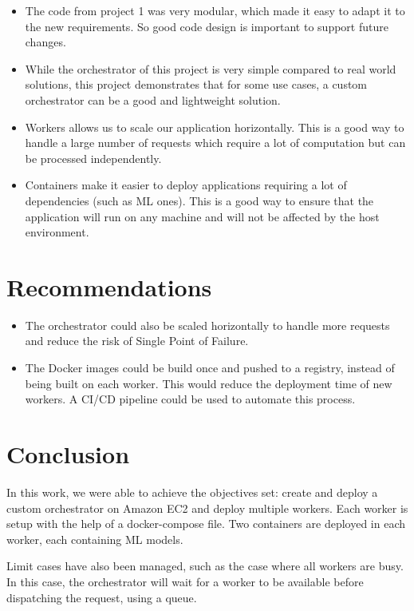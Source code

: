 \documentclass[letterpaper,headings=standardclasses,parskip=half]{scrartcl}
\begin{document}
\begin{itemize}
    \item The code from project 1 was very modular, which made it easy to adapt it to the new requirements. So good code design is important to support future changes.
    \item While the orchestrator of this project is very simple compared to real world solutions, this project demonstrates that for some use cases, a custom orchestrator can be a good and lightweight solution.
    \item Workers allows us to scale our application horizontally. This is a good way to handle a large number of requests which require a lot of computation but can be processed independently.
    \item Containers make it easier to deploy applications requiring a lot of dependencies (such as ML ones). This is a good way to ensure that the application will run on any machine and will not be affected by the host environment.
\end{itemize}

\section{Recommendations}

\begin{itemize}
    \item The orchestrator could also be scaled horizontally to handle more requests and reduce the risk of Single Point of Failure.
    \item The Docker images could be build once and pushed to a registry, instead of being built on each worker. This would reduce the deployment time of new workers. A CI/CD pipeline could be used to automate this process.
\end{itemize}

\section{Conclusion}

In this work, we were able to achieve the objectives set: create and deploy a custom orchestrator on Amazon EC2 and deploy multiple workers. Each worker is setup with the help of a docker-compose file. Two containers are deployed in each worker, each containing ML models.

Limit cases have also been managed, such as the case where all workers are busy. In this case, the orchestrator will wait for a worker to be available before dispatching the request, using a queue.
\end{document}
